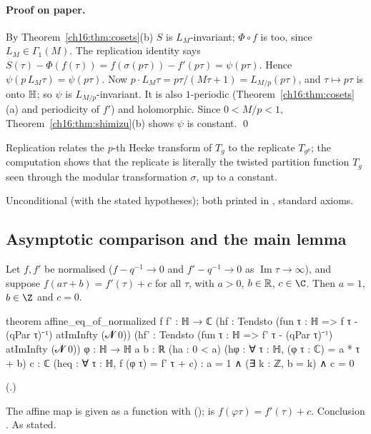 \paragraph{Proof on paper.}  By Theorem~\ref{ch16:thm:cosets}(b) $S$ is $L_M$-invariant; $\Phi\circ f$ is too, since
$L_M\in\Gamma_1(M)$.  The replication identity says $S(\tau)-\Phi(f(\tau))=f(\sigma(p\tau))-f'(p\tau)=\psi(p\tau)$.  Hence
$\psi(p\,L_M\tau)=\psi(p\tau)$.  Now $p\cdot L_M\tau=p\tau/(M\tau+1)=L_{M/p}(p\tau)$, and $\tau\mapsto p\tau$ is onto
$\mathbb{H}$; so $\psi$ is $L_{M/p}$-invariant.  It is also $1$-periodic (Theorem~\ref{ch16:thm:cosets}(a) and
periodicity of $f'$) and holomorphic.  Since $0<M/p<1$, Theorem~\ref{ch16:thm:shimizu}(b) shows $\psi$ is constant. \qed
\begin{physics}
Replication relates the $p$-th Hecke transform of $T_g$ to the replicate $T_{g^p}$; the computation shows that the
replicate is literally the twisted partition function $T_g$ seen through the modular transformation $\sigma$, up to a
constant.
\end{physics}
\begin{status}
Unconditional (with the stated hypotheses); both printed in ,
standard axioms.
\end{status}

\subsection{Asymptotic comparison and the main lemma}

\begin{lemma}\label{ch16:lem:affine}
Let $f,f'$ be normalised ($f-q^{-1}\to0$ and $f'-q^{-1}\to0$ as $\operatorname{Im}\tau\to\infty$), and suppose
$f(a\tau+b)=f'(\tau)+c$ for all $\tau$, with $a>0$, $b\in\mathbb{R}$, $c\in\C$.  Then $a=1$, $b\in\Z$ and $c=0$.
\end{lemma}
\begin{leancode}
theorem affine_eq_of_normalized {f f' : ℍ → ℂ}
    (hf : Tendsto (fun τ : ℍ => f τ - (qPar τ)⁻¹) atImInfty (𝓝 0))
    (hf' : Tendsto (fun τ : ℍ => f' τ - (qPar τ)⁻¹) atImInfty (𝓝 0))
    {φ : ℍ → ℍ} {a b : ℝ} (ha : 0 < a) (hφ : ∀ τ : ℍ, (φ τ : ℂ) = a * τ + b) {c : ℂ}
    (heq : ∀ τ : ℍ, f (φ τ) = f' τ + c) :
    a = 1 ∧ (∃ k : ℤ, b = k) ∧ c = 0
\end{leancode}
(.)
\begin{dictionary}
The affine map is given as a function  with  ();  is
$f(\varphi\tau)=f'(\tau)+c$.  Conclusion .  As stated.
\end{dictionary}
